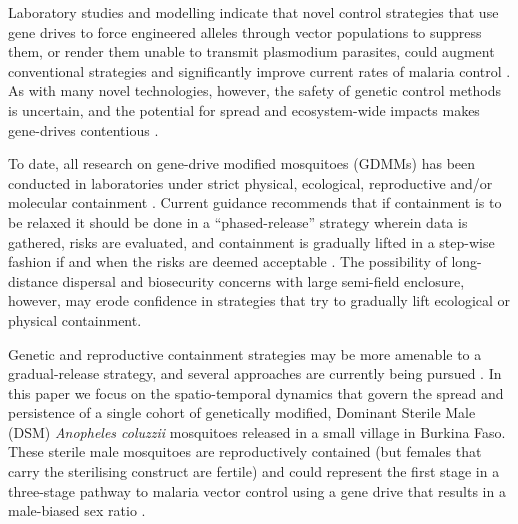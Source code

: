 \documentclass[]{bmcart}
\begin{document}
Laboratory studies and modelling indicate that novel control strategies that use gene drives to force engineered alleles through vector populations to suppress them, or render them unable to transmit plasmodium parasites, could augment conventional strategies and significantly improve current rates of malaria control \citep{Gabrieli2014,Beaghton2017, CarballarLejarazu2020,Simoni2020}. As with many novel technologies, however, the safety of genetic control methods is uncertain, and the potential for spread and ecosystem-wide impacts makes gene-drives contentious \citep{Ledord2015,Champer2016}.

To date, all research on gene-drive modified mosquitoes (GDMMs) has been conducted in laboratories under strict physical, ecological, reproductive and/or molecular containment \citep{Akbari2015}. Current guidance recommends that if containment is to be relaxed it should be done in a ``phased-release'' strategy wherein data is gathered, risks are evaluated, and containment is gradually lifted in a step-wise fashion if and when the risks are deemed acceptable \citep{WHOTDRFNIH2014,NASEM2016}. The possibility of long-distance dispersal \citep{Huestis2019} and biosecurity concerns with large semi-field enclosure, however, may erode confidence in strategies that try to gradually lift ecological or physical containment. 

Genetic and reproductive containment strategies may be more amenable to a gradual-release strategy, and several approaches are currently being pursued \citep{Klein2012,Galizi2014,Nash2019}. In this paper we focus on the spatio-temporal dynamics that govern the spread and persistence of a single cohort of genetically modified, Dominant Sterile Male (DSM) \textit{Anopheles coluzzii} mosquitoes released in a small village in Burkina Faso. These sterile male mosquitoes are reproductively contained (but females that carry the sterilising construct are fertile) and could represent the first stage in a three-stage pathway to malaria vector control using a gene drive that results in a male-biased sex ratio \citep{Beaghton2017a,North2019}.

\end{document}
